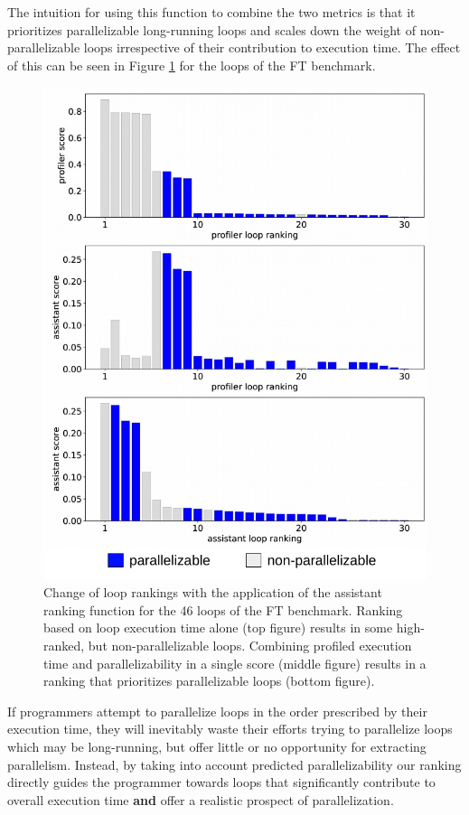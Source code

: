 The intuition for using this function to combine the two metrics is that it prioritizes parallelizable long-running loops and scales down the weight of non-parallelizable loops irrespective of their contribution to execution time. The effect of this can be seen in Figure \ref{fig:ft_loop_ranking} for the loops of the FT benchmark.
\begin{figure}[htb!]
\includegraphics[width=1.0\textwidth]{images/ft_filter.pdf}
\caption{Change of loop rankings with the application of the assistant ranking function for the 46 loops of the FT benchmark. Ranking based on loop execution time alone (top figure) results in some high-ranked, but non-parallelizable loops. Combining profiled execution time and parallelizability in a single score (middle figure) results in a ranking that prioritizes parallelizable loops (bottom figure).}
\label{fig:ft_loop_ranking}
\end{figure}
If programmers attempt to parallelize loops in the order prescribed by their execution time, they will inevitably waste
their efforts trying to parallelize loops which may be long-running, but offer little or no opportunity for extracting parallelism. Instead, by taking into account predicted parallelizability our ranking directly guides the programmer towards loops that significantly contribute to overall execution time \textbf{and} offer a realistic prospect of parallelization.

